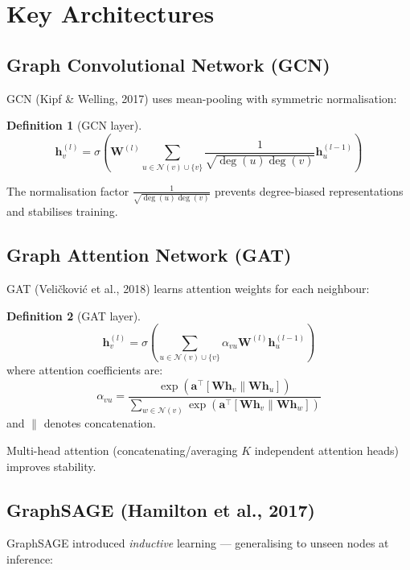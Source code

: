 \documentclass[11pt,a4paper,oneside,openany]{book}
\theoremstyle{definition}
\newtheorem{definition}{Definition}[chapter]
\theoremstyle{plain}
\theoremstyle{remark}
\begin{document}
\section{Key Architectures}\label{sec:gnn-archs}

\subsection{Graph Convolutional Network (GCN)}

GCN (Kipf \& Welling, 2017) uses mean-pooling with symmetric normalisation:

\begin{definition}[GCN layer]
	$$\mathbf{h}_v^{(l)} = \sigma\!\left( \mathbf{W}^{(l)} \sum_{u \in \mathcal{N}(v) \cup \{v\}} \frac{1}{\sqrt{\deg(u)\deg(v)}} \mathbf{h}_u^{(l-1)} \right)$$
\end{definition}

The normalisation factor $\frac{1}{\sqrt{\deg(u)\deg(v)}}$ prevents degree-biased representations and stabilises training.

\subsection{Graph Attention Network (GAT)}

GAT (Veli\v{c}kovi\'{c} et al., 2018) learns attention weights for each neighbour:

\begin{definition}[GAT layer]
	$$\mathbf{h}_v^{(l)} = \sigma\!\left( \sum_{u \in \mathcal{N}(v) \cup \{v\}} \alpha_{vu} \mathbf{W}^{(l)} \mathbf{h}_u^{(l-1)} \right)$$
	where attention coefficients are:
	$$\alpha_{vu} = \frac{\exp(\mathbf{a}^\top [\mathbf{W}\mathbf{h}_v \| \mathbf{W}\mathbf{h}_u])}{\sum_{w \in \mathcal{N}(v)} \exp(\mathbf{a}^\top [\mathbf{W}\mathbf{h}_v \| \mathbf{W}\mathbf{h}_w])}$$
	and $\|$ denotes concatenation.
\end{definition}

Multi-head attention (concatenating/averaging $K$ independent attention heads) improves stability.

\subsection{GraphSAGE (Hamilton et al., 2017)}

GraphSAGE introduced \emph{inductive} learning --- generalising to unseen nodes at inference:
\end{document}
